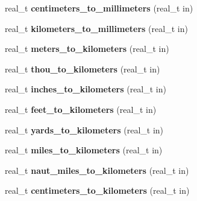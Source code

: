 \begin{DoxyCompactItemize}
\item 
\hypertarget{namespaceetk_ad0edffd934e35c259815d7ea483540d3}{real\-\_\-t {\bfseries centimeters\-\_\-to\-\_\-millimeters} (real\-\_\-t in)}\label{namespaceetk_ad0edffd934e35c259815d7ea483540d3}

\item 
\hypertarget{namespaceetk_ad5dc7b48e945f925413fa470a04c4dc4}{real\-\_\-t {\bfseries kilometers\-\_\-to\-\_\-millimeters} (real\-\_\-t in)}\label{namespaceetk_ad5dc7b48e945f925413fa470a04c4dc4}

\item 
\hypertarget{namespaceetk_ad473e6e791bbc2cdf2fea7c8588bbe99}{real\-\_\-t {\bfseries meters\-\_\-to\-\_\-kilometers} (real\-\_\-t in)}\label{namespaceetk_ad473e6e791bbc2cdf2fea7c8588bbe99}

\item 
\hypertarget{namespaceetk_a75e8b0886f844ae3b32480e2f7329399}{real\-\_\-t {\bfseries thou\-\_\-to\-\_\-kilometers} (real\-\_\-t in)}\label{namespaceetk_a75e8b0886f844ae3b32480e2f7329399}

\item 
\hypertarget{namespaceetk_a4f5cb8c8c80acaf6cdf555c9cafed97f}{real\-\_\-t {\bfseries inches\-\_\-to\-\_\-kilometers} (real\-\_\-t in)}\label{namespaceetk_a4f5cb8c8c80acaf6cdf555c9cafed97f}

\item 
\hypertarget{namespaceetk_a6f2a405c924a4be8edbcd7a7ccc2813e}{real\-\_\-t {\bfseries feet\-\_\-to\-\_\-kilometers} (real\-\_\-t in)}\label{namespaceetk_a6f2a405c924a4be8edbcd7a7ccc2813e}

\item 
\hypertarget{namespaceetk_ab113c90a1bde2d9fba5cea04207ab35f}{real\-\_\-t {\bfseries yards\-\_\-to\-\_\-kilometers} (real\-\_\-t in)}\label{namespaceetk_ab113c90a1bde2d9fba5cea04207ab35f}

\item 
\hypertarget{namespaceetk_aea6601208276c32cabfa2f8ee68e0beb}{real\-\_\-t {\bfseries miles\-\_\-to\-\_\-kilometers} (real\-\_\-t in)}\label{namespaceetk_aea6601208276c32cabfa2f8ee68e0beb}

\item 
\hypertarget{namespaceetk_a9f1c9daaf430be1981e0ec9e49d6fa79}{real\-\_\-t {\bfseries naut\-\_\-miles\-\_\-to\-\_\-kilometers} (real\-\_\-t in)}\label{namespaceetk_a9f1c9daaf430be1981e0ec9e49d6fa79}

\item 
\hypertarget{namespaceetk_a742461d0df269dab3cf3cd131749c7ff}{real\-\_\-t {\bfseries centimeters\-\_\-to\-\_\-kilometers} (real\-\_\-t in)}\label{namespaceetk_a742461d0df269dab3cf3cd131749c7ff}


\end{DoxyCompactItemize}
